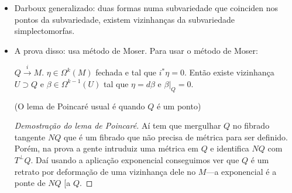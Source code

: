 \begin{itemize}
	\item Darboux generalizado: duas formas numa subvariedade que coinciden nos pontos da subvariedade, existem vizinhanças da subvariedade simplectomorfas.

	\item A prova disso: usa m\'etodo de Moser.  Para usar o m\'etodo de Moser:
		\begin{lemma}
			$Q \overset{i}{\longrightarrow}M$. $\eta\in\Omega^{k}(M)$ fechada e tal que $i^*\eta=0$. Ent\~ao existe  vizinhança $U\supset Q$ e $\beta\in\Omega^{k-1}(U)$ tal que $\eta=d\beta$ e $\beta|_{Q}=0$.

			(O lema de Poincar\'e usual \'e quando $Q$ \'e um ponto)
		\end{lemma}
		\begin{proof}[Demostra\c c\~ao do lema de Poincar\'e]
			A\'i tem que mergulhar $Q$ no fibrado tangente $NQ$ que \'e um fibrado que n\~ao precisa de m\'etrica para ser definido. Por\'em, na prova a gente intruduiz uma m\'etrica em $Q$ e identifica $NQ$ com  $T^\perp Q$. Da\'i usando a aplica\c c\~ao exponencial conseguimos ver que $Q$ \'e um retrato por deforma\c c\~ao de uma vizinhança dele no $M$---a exponencial \'e a ponte de $NQ$ [a $Q$.


\end{proof}
\end{itemize}
